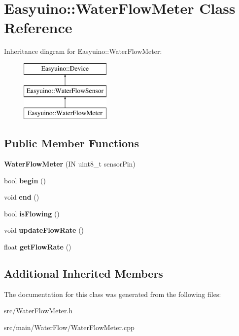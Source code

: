 \hypertarget{class_easyuino_1_1_water_flow_meter}{}\section{Easyuino\+:\+:Water\+Flow\+Meter Class Reference}
\label{class_easyuino_1_1_water_flow_meter}
Inheritance diagram for Easyuino\+:\+:Water\+Flow\+Meter\+:\begin{figure}[H]
\begin{center}
\leavevmode
\includegraphics[height=3.000000cm]{class_easyuino_1_1_water_flow_meter}
\end{center}
\end{figure}
\subsection*{Public Member Functions}
\begin{DoxyCompactItemize}
\item 
\mbox{\label{class_easyuino_1_1_water_flow_meter_a253cbf06355c4e7dd79ef801d18c5119}} 
{\bfseries Water\+Flow\+Meter} (IN uint8\+\_\+t sensor\+Pin)
\item 
\mbox{\label{class_easyuino_1_1_water_flow_meter_a400c25b10a7cde45c623805546d071cd}} 
bool {\bfseries begin} ()
\item 
\mbox{\label{class_easyuino_1_1_water_flow_meter_a47024d4da9568e42743a875c08c33121}} 
void {\bfseries end} ()
\item 
\mbox{\label{class_easyuino_1_1_water_flow_meter_a40e53d19dc4458bd149618053a52389f}} 
bool {\bfseries is\+Flowing} ()
\item 
\mbox{\label{class_easyuino_1_1_water_flow_meter_a1798974218a55932876fafd749b98726}} 
void {\bfseries update\+Flow\+Rate} ()
\item 
\mbox{\label{class_easyuino_1_1_water_flow_meter_a3f531a6a6f8bf9a27d43915004889085}} 
float {\bfseries get\+Flow\+Rate} ()
\end{DoxyCompactItemize}
\subsection*{Additional Inherited Members}


The documentation for this class was generated from the following files\+:\begin{DoxyCompactItemize}
\item 
src/Water\+Flow\+Meter.\+h\item 
src/main/\+Water\+Flow/Water\+Flow\+Meter.\+cpp\end{DoxyCompactItemize}

